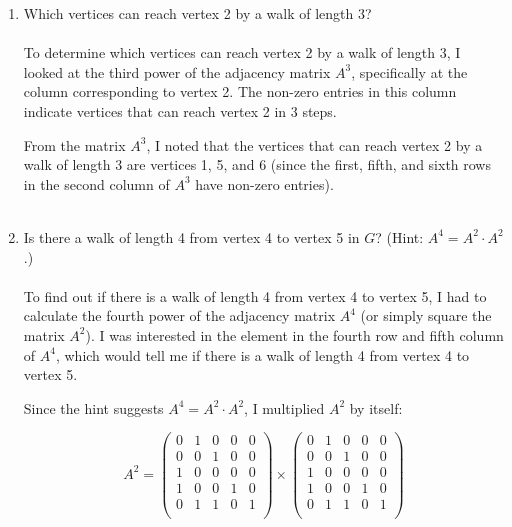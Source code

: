 \documentclass{amsart}
\theoremstyle{definition}
\theoremstyle{Exercise}
\theoremstyle{remark}
\theoremstyle{rule}
\numberwithin{equation}{section}
\begin{document}
\begin{enumerate}[label=(\alph*)]
\item Which vertices can reach vertex 2 by a walk of length 3?\\\\
To determine which vertices can reach vertex 2 by a walk of length 3, I looked at the third power of the adjacency matrix \( A^3 \), specifically at the column corresponding to vertex 2. The non-zero entries in this column indicate vertices that can reach vertex 2 in 3 steps.

From the matrix \( A^3 \), I noted that the vertices that can reach vertex 2 by a walk of length 3 are vertices 1, 5, and 6 (since the first, fifth, and sixth rows in the second column of \( A^3 \) have non-zero entries).
\\\\

\item Is there a walk of length 4 from vertex 4 to vertex 5 in $G$? (Hint: $A^4 = A^2\cdot A^2$.)\\\\
To find out if there is a walk of length 4 from vertex 4 to vertex 5, I had to calculate the fourth power of the adjacency matrix \( A^4 \) (or simply square the matrix \( A^2 \)). I was interested in the element in the fourth row and fifth column of \( A^4 \), which would tell me if there is a walk of length 4 from vertex 4 to vertex 5.

Since the hint suggests \( A^4 = A^2 \cdot A^2 \), I multiplied \( A^2 \) by itself:

\[
A^2  = \begin{pmatrix}
0 & 1 & 0 & 0 & 0 \\
0 & 0 & 1 & 0 & 0 \\
1 & 0 & 0 & 0 & 0 \\
1 & 0 & 0 & 1 & 0 \\
0 & 1 & 1 & 0 & 1 \\
\end{pmatrix} \times 
\begin{pmatrix}
0 & 1 & 0 & 0 & 0 \\
0 & 0 & 1 & 0 & 0 \\
1 & 0 & 0 & 0 & 0 \\
1 & 0 & 0 & 1 & 0 \\
0 & 1 & 1 & 0 & 1 \\
\end{pmatrix} 
\]


\end{enumerate}
\end{document}
